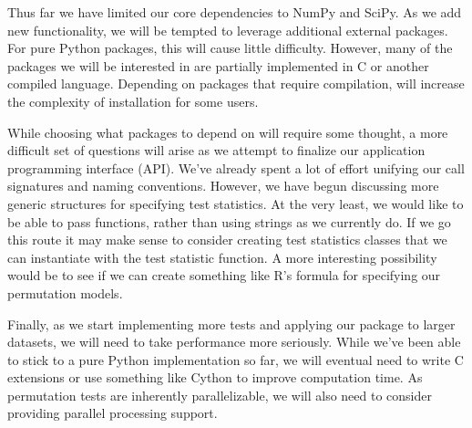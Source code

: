 

Thus far we have limited our core dependencies to NumPy and SciPy.
As we add new functionality, we will be tempted to leverage additional
external packages.  For pure Python packages, this will cause little
difficulty.  However, many of the packages we will be interested in
are partially implemented in C or another compiled language.  Depending
on packages that require compilation, will increase the complexity
of installation for some users.

While choosing what packages to depend
on will require some thought, a more difficult set of questions will arise as
we attempt to finalize our application programming interface (API).  We've
already spent a lot of effort unifying our call signatures and naming
conventions.  However, we have begun discussing more generic structures for
specifying test statistics.  At the very least, we would like to be able to
pass functions, rather than using strings as we currently do.  If we go this
route it may make sense to consider creating test statistics classes that
we can instantiate with the test statistic function.  A more interesting
possibility would be to see if we can create something like R's formula
for specifying our permutation models.

Finally, as we start implementing more tests and applying our package
to larger datasets, we will need to take performance more seriously.
While we've been able to stick to a pure Python implementation so far,
we will eventual need to write C extensions or use something like
Cython to improve computation time.  As permutation tests are inherently
parallelizable, we will also need to consider providing parallel processing
support.
